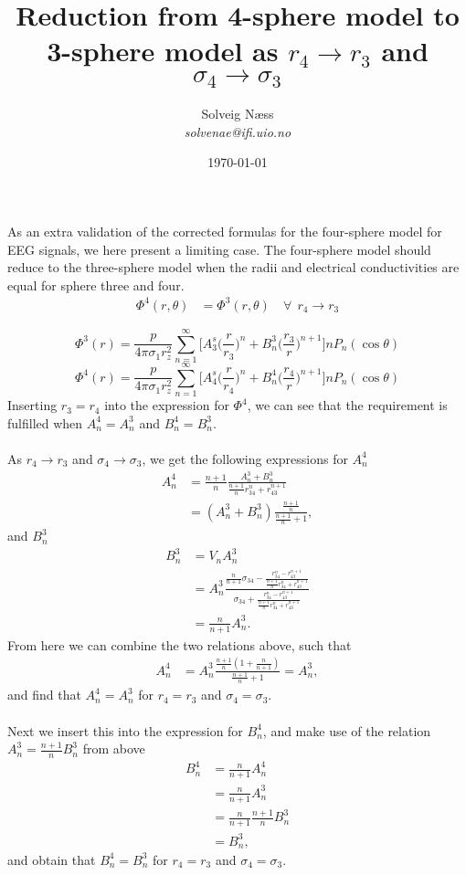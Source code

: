 \documentclass{article}
\title{Reduction from 4-sphere model to 3-sphere model as $r_4 \to r_3$ and $\sigma_4 \to \sigma_3$}
\author{Solveig Næss \\ \textit{solvenae@ifi.uio.no} }
\date{\today}
\begin{document}
\maketitle
As an extra validation of the corrected formulas for the four-sphere model for EEG signals, we here present a limiting case. The four-sphere model should reduce to the three-sphere model when the radii and electrical conductivities are equal for sphere three and four. 
\begin{align*}
\Phi^4(r, \theta) &= \Phi^3(r, \theta) \quad \forall~~ r_4 \to r_3
\end{align*}

\begin{equation}\label{eq:phi_sphere_3}
\Phi^3(r) = \frac{p}{4 \pi \sigma_1 r_z^2}\sum_{n = 1}^{\infty} \big[ A_3^s \big(\frac{r}{r_3}\big)^n + B_n^3\big(\frac{r_3}{r}\big)^{n+1}\big] n P_n(\cos{\theta})
\end{equation}
\begin{equation}\label{eq:phi_sphere_4}
\Phi^4(r) = \frac{p}{4 \pi \sigma_1 r_z^2}\sum_{n = 1}^{\infty} \big[ A_4^s \big(\frac{r}{r_4}\big)^n + B_n^4\big(\frac{r_4}{r}\big)^{n+1}\big] n P_n(\cos{\theta})
\end{equation}
Inserting $r_3 = r_4$ into the expression for $\Phi^4$, we can see that the requirement is fulfilled when $A_n^4 = A_n^3$ and $B_n^4 = B_n^3$.
\\\\
As $r_4 \to r_3$ and $\sigma_4 \to \sigma_3$, we get the following expressions for $A_n^4$
\begin{align*}
A_n^4 &= \frac{n+1}{n} \frac{A_n^3 + B_n^3}{\frac{n+1}{n} r_{34}^n + r_{43}^{n+1}} \\
&= (A_n^3 + B_n^3) \frac{\frac{n+1}{n}}{\frac{n+1}{n} + 1},
\end{align*}
and $B_n^3$
\begin{align*}
B_n^3 &= V_n A_n^3 \\
&= A_n^3 \frac{ \frac{n}{n+1} \sigma_{34} - \frac{r_{34}^n - r_{43}^{n+1}}{\frac{n+1}{n} r_{34}^n + r_{43}^{n+1}}}{\sigma_{34} + \frac{r_{34}^n - r_{43}^{n+1}}{\frac{n+1}{n} r_{34}^n + r_{43}^{n+1}}} \\
&= \frac{n}{n+1}A_n^3.
\end{align*}
From here we can combine the two relations above, such that
\begin{align*}
A_n^4 &= A_n^3 \frac{\frac{n+1}{n}(1 + \frac{n}{n+1})}{\frac{n+1}{n} + 1} = A_n^3,
\end{align*}
and find that $A_n^4 = A_n^3$ for $r_4=r_3$ and $\sigma_4 = \sigma_3$.
\\\\
Next we insert this into the expression for $B_n^4$, and make use of the relation $A_n^3 = \frac{n+1}{n}B_n^3$ from above
\begin{align*}
B_n^4 &= \frac{n}{n+1}A_n^4 \\
&= \frac{n}{n+1}A_n^3 \\
&= \frac{n}{n+1} \frac{n+1}{n} B_n^3 \\
&= B_n^3,
\end{align*}
and obtain that $B_n^4 = B_n^3$ for $r_4=r_3$ and $\sigma_4 = \sigma_3$.
\end{document}
